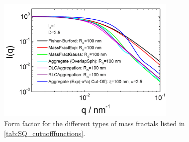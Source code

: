 \begin{figure}[htb]
\begin{center}
\includegraphics[width=0.768\textwidth,height=0.528\textwidth]{../images/form_factor/cluster/AggregateComparison.png}
\end{center}
\caption{Form factor for the different types of mass fractals listed in \ref{tab:SQ_cutuofffunctions}.}
\label{fig:FFCluster}
\end{figure}


